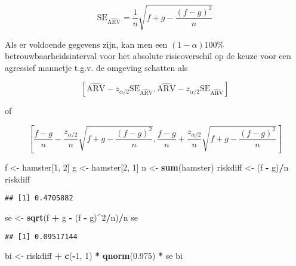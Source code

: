 \documentclass[
  12pt,dutch,coursenotes]{book}
\newenvironment{Shaded}{\begin{snugshade}}{\end{snugshade}}
\newcommand{\DecValTok}[1]{\textcolor[rgb]{0.00,0.00,0.81}{#1}}
\newcommand{\FloatTok}[1]{\textcolor[rgb]{0.00,0.00,0.81}{#1}}
\newcommand{\KeywordTok}[1]{\textcolor[rgb]{0.13,0.29,0.53}{\textbf{#1}}}
\newcommand{\NormalTok}[1]{#1}
\newcommand{\OperatorTok}[1]{\textcolor[rgb]{0.81,0.36,0.00}{\textbf{#1}}}
\newcommand{\StringTok}[1]{\textcolor[rgb]{0.31,0.60,0.02}{#1}}
\theoremstyle{definition}
\theoremstyle{definition}
\theoremstyle{definition}
\theoremstyle{remark}
\begin{document}
\begin{equation*}
\text{SE}_{\widehat{\text{ARV}}}=\frac{1}{n}\sqrt{f+g-\frac{(f-g)^2}{n}}
\end{equation*}

Als er voldoende gegevens zijn, kan men een \((1-\alpha)100\%\)
betrouwbaarheidsinterval voor het absolute risicoverschil op de keuze voor een agressief mannetje t.g.v. de omgeving schatten
als

\[\left[\widehat{\text{ARV}}-z_{\alpha/2}\text{SE}_{\widehat{\text{ARV}}},\widehat{\text{ARV}}-z_{\alpha/2}\text{SE}_{\widehat{\text{ARV}}}\right]\]

of

\[\left[\frac{f-g}{n}-\frac{z_{\alpha/2}}{n}\sqrt{f+g-\frac{(f-g)^2}{n}},\frac{f-g}{n}+\frac{z_{\alpha/2}}{n}\sqrt{f+g-\frac{(f-g)^2}{n}}\right] \]

\begin{Shaded}
\begin{Highlighting}[]
\NormalTok{f \textless{}{-}}\StringTok{ }\NormalTok{hamster[}\DecValTok{1}\NormalTok{, }\DecValTok{2}\NormalTok{]}
\NormalTok{g \textless{}{-}}\StringTok{ }\NormalTok{hamster[}\DecValTok{2}\NormalTok{, }\DecValTok{1}\NormalTok{]}
\NormalTok{n \textless{}{-}}\StringTok{ }\KeywordTok{sum}\NormalTok{(hamster)}
\NormalTok{riskdiff \textless{}{-}}\StringTok{ }\NormalTok{(f }\OperatorTok{{-}}\StringTok{ }\NormalTok{g)}\OperatorTok{/}\NormalTok{n}
\NormalTok{riskdiff}
\end{Highlighting}
\end{Shaded}

\begin{verbatim}
## [1] 0.4705882
\end{verbatim}

\begin{Shaded}
\begin{Highlighting}[]
\NormalTok{se \textless{}{-}}\StringTok{ }\KeywordTok{sqrt}\NormalTok{(f }\OperatorTok{+}\StringTok{ }\NormalTok{g }\OperatorTok{{-}}\StringTok{ }\NormalTok{(f }\OperatorTok{{-}}\StringTok{ }\NormalTok{g)}\OperatorTok{\^{}}\DecValTok{2}\OperatorTok{/}\NormalTok{n)}\OperatorTok{/}\NormalTok{n}
\NormalTok{se}
\end{Highlighting}
\end{Shaded}

\begin{verbatim}
## [1] 0.09517144
\end{verbatim}

\begin{Shaded}
\begin{Highlighting}[]
\NormalTok{bi \textless{}{-}}\StringTok{ }\NormalTok{riskdiff }\OperatorTok{+}\StringTok{ }\KeywordTok{c}\NormalTok{(}\OperatorTok{{-}}\DecValTok{1}\NormalTok{, }\DecValTok{1}\NormalTok{) }\OperatorTok{*}\StringTok{ }\KeywordTok{qnorm}\NormalTok{(}\FloatTok{0.975}\NormalTok{) }\OperatorTok{*}\StringTok{ }\NormalTok{se}
\NormalTok{bi}
\end{Highlighting}
\end{Shaded}
\end{document}
